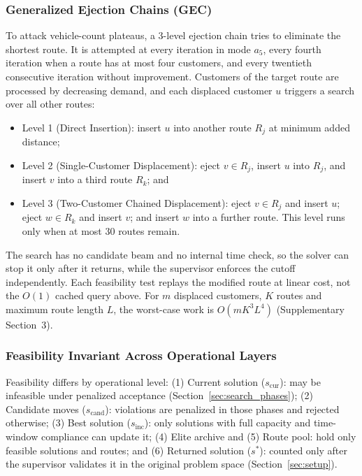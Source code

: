 \documentclass{ieeeaccess}
\begin{document}
\subsubsection{Generalized Ejection Chains (GEC)}
\label{sec:gec_methodology}
To attack vehicle-count plateaus, a 3-level ejection chain tries to eliminate the shortest route. It is attempted at every iteration in mode $a_5$, every fourth iteration when a route has at most four customers, and every twentieth consecutive iteration without improvement. Customers of the target route are processed by decreasing demand, and each displaced customer $u$ triggers a search over all other routes:
\begin{itemize}
    \item[(i)] Level 1 (Direct Insertion): insert $u$ into another route $R_j$ at minimum added distance;
    \item[(ii)] Level 2 (Single-Customer Displacement): eject $v \in R_j$, insert $u$ into $R_j$, and insert $v$ into a third route $R_k$; and
    \item[(iii)] Level 3 (Two-Customer Chained Displacement): eject $v \in R_j$ and insert $u$; eject $w \in R_k$ and insert $v$; and insert $w$ into a further route. This level runs only when at most 30 routes remain.
\end{itemize}
The search has no candidate beam and no internal time check, so the solver can stop it only after it returns, while the supervisor enforces the cutoff independently. Each feasibility test replays the modified route at linear cost, not the $O(1)$ cached query above. For $m$ displaced customers, $K$ routes and maximum route length $L$, the worst-case work is $O(m K^3 L^4)$ (Supplementary Section~3).

\subsubsection{Feasibility Invariant Across Operational Layers}
\label{sec:feasibility_invariant}
Feasibility differs by operational level: (1) Current solution ($s_{\text{cur}}$): may be infeasible under penalized acceptance (Section~\ref{sec:search_phases}); (2) Candidate moves ($s_{\text{cand}}$): violations are penalized in those phases and rejected otherwise; (3) Best solution ($s_{\text{inc}}$): only solutions with full capacity and time-window compliance can update it; (4) Elite archive and (5) Route pool: hold only feasible solutions and routes; and (6) Returned solution ($s^*$): counted only after the supervisor validates it in the original problem space (Section~\ref{sec:setup}).
\end{document}
